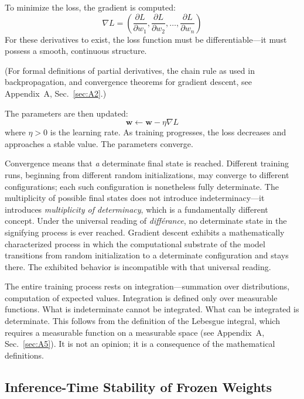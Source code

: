 \documentclass[a4paper,twocolumn,11pt]{article}
\begin{document}
To minimize the loss, the gradient is computed:
\begin{equation}
\nabla L = \left(\frac{\partial L}{\partial w_1}, \frac{\partial L}{\partial w_2}, \ldots, \frac{\partial L}{\partial w_n}\right)
\end{equation}
For these derivatives to exist, the loss function must be differentiable---it must possess a smooth, continuous structure.

(For formal definitions of partial derivatives, the chain rule as used in backpropagation, and convergence theorems for gradient descent, see Appendix~A, Sec.~\ref{sec:A2}.)

The parameters are then updated:
\begin{equation}
\mathbf{w} \leftarrow \mathbf{w} - \eta \nabla L
\end{equation}
where $\eta > 0$ is the learning rate. As training progresses, the loss decreases and approaches a stable value. The parameters converge.

Convergence means that \emph{a} determinate final state is reached. Different training runs, beginning from different random initializations, may converge to different configurations; each such configuration is nonetheless fully determinate. The multiplicity of possible final states does not introduce indeterminacy---it introduces \emph{multiplicity of determinacy}, which is a fundamentally different concept. Under the universal reading of \emph{diff\'erance}, no determinate state in the signifying process is ever reached. Gradient descent exhibits a mathematically characterized process in which the computational substrate of the model transitions from random initialization to a determinate configuration and stays there. The exhibited behavior is incompatible with that universal reading.

The entire training process rests on integration---summation over distributions, computation of expected values. Integration is defined only over measurable functions. What is indeterminate cannot be integrated. What can be integrated is determinate. This follows from the definition of the Lebesgue integral, which requires a measurable function on a measurable space (see Appendix~A, Sec.~\ref{sec:A5}). It is not an opinion; it is a consequence of the mathematical definitions.

\subsection{Inference-Time Stability of Frozen Weights}
\label{sec:irreversibility}
\end{document}
